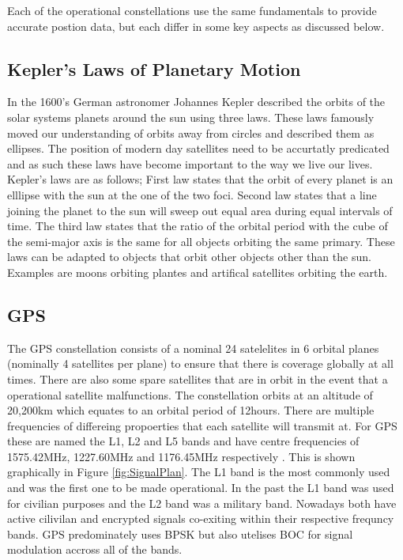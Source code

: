 Each of the operational constellations use the same fundamentals to provide accurate postion data, but each differ in some key aspects as discussed below.

\subsection{Kepler's Laws of Planetary Motion} \label{subsec: OrbitalMechanics}
In the 1600's German astronomer Johannes Kepler described the orbits of the solar systems planets around the sun using three laws. 
These laws famously moved our understanding of orbits away from circles and described them as ellipses. The position of modern day satellites need to be accurtatly
predicated and as such these laws have become important to the way we live our lives. Kepler's laws are as follows; First law states that the orbit of every planet is an
elllipse with the sun at the one of the two foci. Second law states that a line joining the planet to the sun will sweep out equal area during equal intervals of time.
The third law states that the ratio of the orbital period with the cube of the semi-major axis is the same for all objects orbiting the same primary. These laws can be
adapted to objects that orbit other objects other than the sun. Examples are moons orbiting plantes and artifical satellites orbiting the earth.

\subsection{GPS} \label{subsec:GNSS_GPSIntro}
The GPS constellation consists of a nominal 24 satelelites in 6 orbital planes (nominally 4 satellites per plane) to ensure that there is coverage globally at all times.
There are also some spare satellites that are in orbit in the event that a operational satellite malfunctions.
The constellation orbits at an altitude of 20,200km which equates to an orbital period of 12hours.
There are multiple frequencies of differeing propoerties that each satellite will transmit at. For GPS these are named the L1, L2 and L5 bands and have centre frequencies
of 1575.42MHz, 1227.60MHz and 1176.45MHz respectively \cite{RN49}. This is shown graphically in Figure \ref{fig:SignalPlan}. The L1 band is the most commonly used and was the first one to be made operational. In the past the L1
band was used for civilian purposes and the L2 band was a military band. Nowadays both have active cilivilan and encrypted signals co-exiting within their respective
frequncy bands. GPS predominately uses BPSK but also utelises BOC for signal modulation accross all of the bands.  

